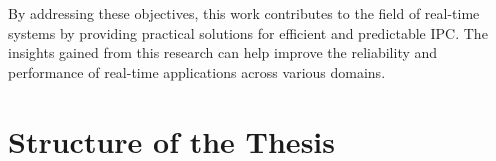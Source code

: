 By addressing these objectives, this work contributes to the field of real-time systems by providing practical solutions for efficient and predictable \ac{IPC}. The insights gained from this research can help improve the reliability and performance of real-time applications across various domains.

\section{Structure of the Thesis}
